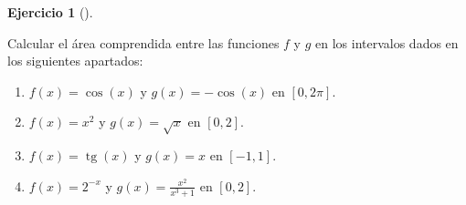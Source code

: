 \documentclass[
  spanish,
  a4paper,
]{scrreport}
\theoremstyle{definition}
\newtheorem{exercise}{Ejercicio}[chapter]
\theoremstyle{remark}
\begin{document}
\begin{exercise}[]\protect\hypertarget{exr-area-entre-funciones}{}\label{exr-area-entre-funciones}

Calcular el área comprendida entre las funciones \(f\) y \(g\) en los
intervalos dados en los siguientes apartados:

\begin{enumerate}
\def\labelenumi{\alph{enumi}.}
\item
  \(f(x)=\cos(x)\) y \(g(x)=-\cos(x)\) en \([0,2\pi]\).
\item
  \(f(x)=x^2\) y \(g(x)=\sqrt{x}\) en \([0,2]\).
\item
  \(f(x)=\operatorname{tg}(x)\) y \(g(x)=x\) en \([-1,1]\).
\item
  \(f(x)= 2^{-x}\) y \(g(x)=\frac{x^2}{x^3+1}\) en \([0,2]\).
\end{enumerate}

\end{exercise}
\end{document}
